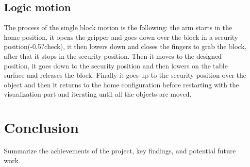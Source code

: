 \documentclass[12pt,a4paper]{article}
\begin{document}
\subsection{Logic motion}\label{subsec:logic}
The process of the single block motion is the following: the arm starts in the home position, it opens the gripper and goes down over the block in a security position(-0.5?check), it then lowers down and closes the fingers to grab the block, after that it stops in the security position. Then it moves to the designed position, it goes down to the security position and then lowers on the table surface and releases the block. Finally it goes up to the security position over the object and then it returns to the home configuration before restarting with the visualization part and iterating until all the objects are moved.

\section{Conclusion}\label{sec:conclusion}
Summarize the achievements of the project, key findings, and potential future work. 
\end{document}
